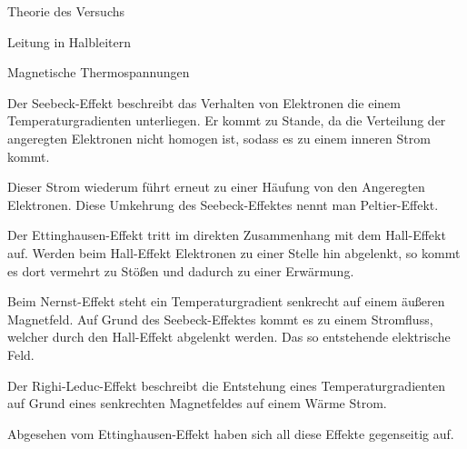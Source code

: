 \documentclass[pdftex, a4paper,11pt, twoside, ngerman]{report}
\begin{document}
\begin{chapter}{Theorie des Versuchs}
\begin{section}{Leitung in Halbleitern}
        \begin{subsection}{Magnetische Thermospannungen}

                Der Seebeck-Effekt beschreibt das Verhalten von Elektronen die einem Temperaturgradienten unterliegen. 
                Er kommt zu Stande, da die Verteilung der angeregten Elektronen nicht homogen ist, sodass es zu einem inneren Strom kommt.
                
                Dieser Strom wiederum führt erneut zu einer Häufung von den Angeregten Elektronen.
                Diese Umkehrung des Seebeck-Effektes nennt man Peltier-Effekt.


                Der Ettinghausen-Effekt tritt im direkten Zusammenhang mit dem Hall-Effekt auf.
                Werden beim Hall-Effekt Elektronen zu einer Stelle hin abgelenkt, so kommt es dort vermehrt zu Stößen und dadurch zu einer Erwärmung.
                
                Beim Nernst-Effekt steht ein Temperaturgradient senkrecht auf einem äußeren Magnetfeld.
                Auf Grund des Seebeck-Effektes kommt es zu einem Stromfluss, welcher durch den Hall-Effekt abgelenkt werden.
                Das so entstehende elektrische Feld.


                Der Righi-Leduc-Effekt beschreibt die Entstehung eines Temperaturgradienten auf Grund eines senkrechten Magnetfeldes auf einem Wärme Strom.

                Abgesehen vom Ettinghausen-Effekt haben sich all diese Effekte gegenseitig auf.

        \end{subsection}

    \end{section}
    
    
  \end{chapter}
         
\end{document}
